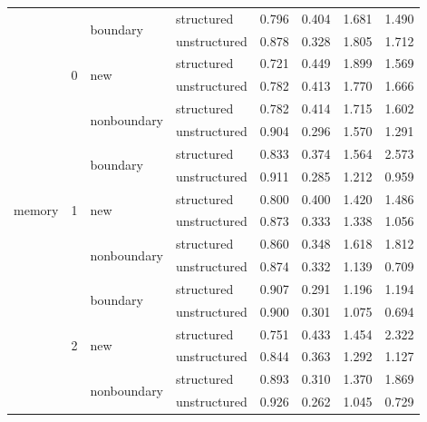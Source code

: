\begin{table}
\begin{tabular}{llllrrrr}
        \cline{1-8} \cline{2-8} \cline{3-8}
        \multirow[t]{18}{*}{memory} & \multirow[t]{6}{*}{0} & \multirow[t]{2}{*}{boundary} & structured & 0.796 & 0.404 & 1.681 & 1.490 \\
         &  &  & unstructured & 0.878 & 0.328 & 1.805 & 1.712 \\
        \cline{3-8}
         &  & \multirow[t]{2}{*}{new} & structured & 0.721 & 0.449 & 1.899 & 1.569 \\
         &  &  & unstructured & 0.782 & 0.413 & 1.770 & 1.666 \\
        \cline{3-8}
         &  & \multirow[t]{2}{*}{nonboundary} & structured & 0.782 & 0.414 & 1.715 & 1.602 \\
         &  &  & unstructured & 0.904 & 0.296 & 1.570 & 1.291 \\
        \cline{2-8} \cline{3-8}
         & \multirow[t]{6}{*}{1} & \multirow[t]{2}{*}{boundary} & structured & 0.833 & 0.374 & 1.564 & 2.573 \\
         &  &  & unstructured & 0.911 & 0.285 & 1.212 & 0.959 \\
        \cline{3-8}
         &  & \multirow[t]{2}{*}{new} & structured & 0.800 & 0.400 & 1.420 & 1.486 \\
         &  &  & unstructured & 0.873 & 0.333 & 1.338 & 1.056 \\
        \cline{3-8}
         &  & \multirow[t]{2}{*}{nonboundary} & structured & 0.860 & 0.348 & 1.618 & 1.812 \\
         &  &  & unstructured & 0.874 & 0.332 & 1.139 & 0.709 \\
        \cline{2-8} \cline{3-8}
         & \multirow[t]{6}{*}{2} & \multirow[t]{2}{*}{boundary} & structured & 0.907 & 0.291 & 1.196 & 1.194 \\
         &  &  & unstructured & 0.900 & 0.301 & 1.075 & 0.694 \\
        \cline{3-8}
         &  & \multirow[t]{2}{*}{new} & structured & 0.751 & 0.433 & 1.454 & 2.322 \\
         &  &  & unstructured & 0.844 & 0.363 & 1.292 & 1.127 \\
        \cline{3-8}
         &  & \multirow[t]{2}{*}{nonboundary} & structured & 0.893 & 0.310 & 1.370 & 1.869 \\
         &  &  & unstructured & 0.926 & 0.262 & 1.045 & 0.729 \\
        \cline{1-8} \cline{2-8} \cline{3-8}
        \bottomrule
        \end{tabular}
    \end{table}
        
